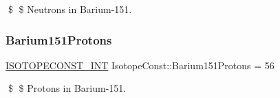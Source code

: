 \$ \$ Neutrons in Barium-\/151. \mbox{\label{group___isotope_const-_barium-_ba151_ga61e66ea47a1cf932e0333c97bf00a070}} 
\subsubsection{\texorpdfstring{Barium151\+Protons}{Barium151Protons}}
{\footnotesize\ttfamily \mbox{\hyperlink{group___isotope_const-_macros_ga5f18360b3e99483a35c32d789e62621c}{I\+S\+O\+T\+O\+P\+E\+C\+O\+N\+S\+T\+\_\+\+I\+NT}} Isotope\+Const\+::\+Barium151\+Protons = 56}

\$ \$ Protons in Barium-\/151. 